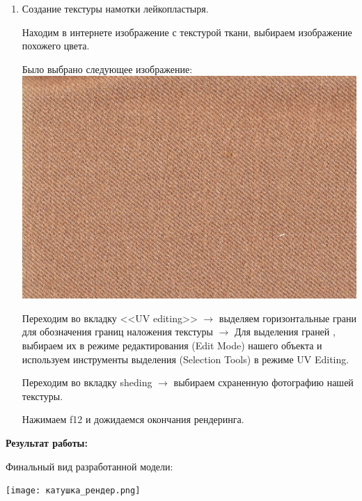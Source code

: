 \documentclass[12pt]{article}
\begin{document}
\begin{enumerate}
\item Создание текстуры намотки лейкопластыря.

Находим в интернете изображение с текстурой ткани, выбираем изображение похожего цвета.


Было выбрано следующее изображение:
\vskip 1cm
{
    \centering
    \includegraphics[width=0.6\linewidth]{текстура_пластырь.jpg}
    \label{fig:i1}
}
\vskip 1cm

Переходим во вкладку <<UV editing>>  $\to $  выделяем  горизонтальные грани для обозначения границ наложения текстуры  $\to $   Для выделения граней , выбираем их в режиме редактирования (Edit Mode) нашего объекта и используем инструменты выделения (Selection Tools) в режиме UV Editing.


Переходим во вкладку sheding  $\to $ выбираем схраненную фотографию нашей текстуры.






































Нажимаем f12 и дожидаемся окончания рендеринга.

\end{enumerate}

{\bf Результат работы:}


Финальный вид разработанной модели:

\vskip 1cm
{
    \centering
    \texttt{[image: катушка\_рендер.png]}
    \label{fig:i1}
}
\vskip 1cm
\end{document}
